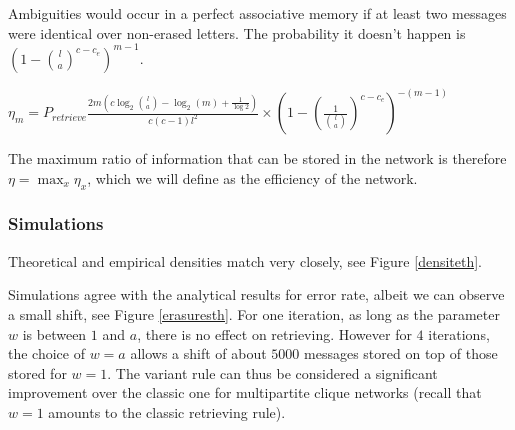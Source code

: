\documentclass[english,10pt,twocolumn]{IEEEtran}
\theoremstyle{definition}
\begin{document}
	Ambiguities would occur in a perfect associative memory if at least two messages were identical over non-erased letters. The probability it doesn't happen is $ (1-{l \choose a}^{c - c_e})^{m-1}$.
	
	
	$\eta_m = P_{retrieve}  \frac{2 m\left(c \log_2{l \choose a } - \log_2(m) + \frac{1}{\log 2} \right)}{c(c-1)l^2} \times (1-(\frac{1}{{l \choose a}})^{c - c_e})^{-(m-1)}$
	
	The maximum ratio of information that can be stored in the network is therefore $\eta = \max_x \eta_x $, which we will define as the efficiency of the network.
	
	\subsubsection{Simulations}
	
		Theoretical and empirical densities match very closely, see Figure \ref{densiteth}. %
		
		
		
		Simulations agree with the analytical results for error rate, albeit we can observe a small shift, see Figure \ref{erasuresth}. For one iteration, as long as the parameter $w$ is between $1$ and $a$, there is no effect on retrieving. However for $4$ iterations, the choice of $w = a$ allows a shift of about $5000$ messages stored on top of those stored for $w = 1$. The variant rule can thus be considered a significant improvement over the classic one for multipartite clique networks (recall that $w = 1$ amounts to the classic retrieving rule).
		
		
	

	
	
	
\end{document}
